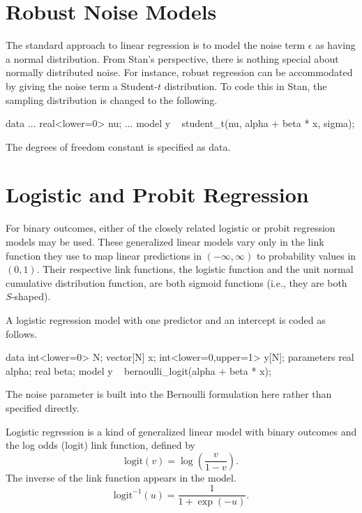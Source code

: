 \section{Robust Noise Models}

The standard approach to linear regression is to model the noise
term $\epsilon$ as having a normal distribution.  From Stan's
perspective, there is nothing special about normally distributed
noise.  For instance, robust regression can be accommodated by giving
the noise term a Student-$t$ distribution.  To code this in Stan, the
sampling distribution is changed to the following.
%

\begin{stancode}
data {
  ...
  real<lower=0> nu;
}
...
model {
  y ~ student_t(nu, alpha + beta * x, sigma);
}
\end{stancode}
%
The degrees of freedom constant  is specified as data.

\section{Logistic and Probit Regression}\label{logistic-probit-regression.section}

For binary outcomes, either of the closely related logistic or probit
regression models may be used.  These generalized linear models vary
only in the link function they use to map linear predictions in
$(-\infty,\infty)$ to probability values in $(0,1)$.  Their respective
link functions, the logistic function and the unit normal cumulative distribution
function, are both sigmoid functions (i.e., they are both {\it S}-shaped).

A logistic regression model with one predictor and an intercept is coded as
follows.
%

\begin{stancode}
data {
  int<lower=0> N;
  vector[N] x;
  int<lower=0,upper=1> y[N];
}
parameters {
  real alpha;
  real beta;
}
model {
  y ~ bernoulli_logit(alpha + beta * x);
} 
\end{stancode}
%
The noise parameter is built into the Bernoulli formulation here
rather than specified directly.  

Logistic regression is a kind of generalized linear model with binary
outcomes and the log odds (logit) link function, defined by
%
\[
\mbox{logit}(v) = \log \left( \frac{v}{1-v} \right).
\]
%
The inverse of the link function appears in the model.  
%
\[
\mbox{logit}^{-1}(u) = \frac{1}{1 + \exp(-u)}.
\]
%

